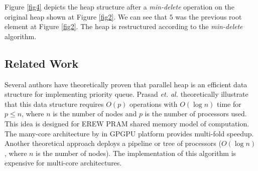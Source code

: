 \documentclass[10pt, conference, compsocconf]{IEEEtran}
\begin{document}
Figure \ref{fig4} depicts the heap structure after a {\it min-delete} operation on the original heap shown at Figure \ref{fig2}. 
We can see that $5$ was the previous root element at Figure \ref{fig2}. 
The heap is restructured according to the {\it min-delete} algorithm.


\subsection{Related Work}
Several authors have theoretically proven that parallel heap is an efficient data structure for implementing priority queue.
Prasad {\it et. al.} \cite{pq0,pq3} theoretically illustrate that this data structure requires $O(p)$ operations with $O(\log n)$ time for $p \leq n$, where $n$ is the number of nodes and $p$ is the number of processors used.
This idea is designed for EREW PRAM shared memory model of computation.
The many-core architecture by \cite{pq2} in GPGPU platform provides multi-fold speedup.
Another theoretical approach \cite{pq4} deploys a pipeline or tree of processors ($O(\log n)$, where $n$ is the number of nodes).
The implementation of this algorithm \cite{pq5} is expensive for multi-core architectures.
\end{document}
